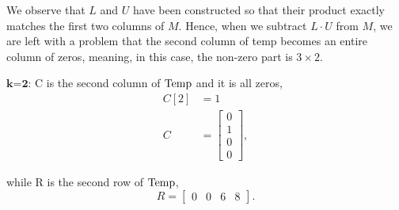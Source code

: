 \begin{tcolorbox}
 We observe that $L$ and $U$ have been constructed so that their product exactly matches the first two columns of $M$.  Hence, when we subtract $L \cdot U$ from $M$, we are left with a problem that the second column of temp becomes an entire column of zeros, meaning, in this case, the non-zero part is $3 \times 2$. 
 \end{tcolorbox}


$\textbf{k=2:}$ C is the second column of ${\rm Temp}$ and it is all zeros,
\begin{align*}
    C[2] &= 1 \\
    C &= \left[ \begin{array}{r} 0\\ 1 \\ 0 \\ 0 \end{array} \right],
\end{align*}

while R is the second row of ${\rm Temp}$,
$$ R = \left[ \begin{array}{rrrr} 0 & 0 & 6 & 8 \end{array} \right]. $$


